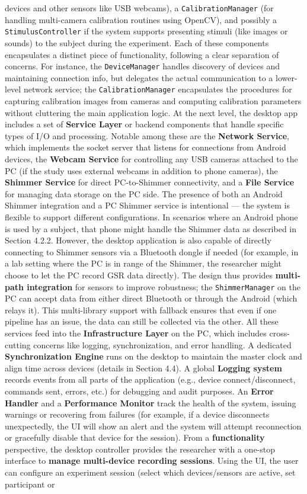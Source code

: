 devices and other sensors like USB webcams), a \texttt{CalibrationManager} (for handling multi-camera calibration routines using OpenCV), and possibly a \texttt{StimulusController} if the system supports presenting stimuli (like images or sounds) to the subject during the experiment. Each of these components encapsulates a distinct piece of functionality, following a clear separation of concerns. For instance, the \texttt{DeviceManager} handles discovery of devices and maintaining connection info, but delegates the actual communication to a lower-level network service; the \texttt{CalibrationManager} encapsulates the procedures for capturing calibration images from cameras and computing calibration parameters without cluttering the main application logic. At the next level, the desktop app includes a set of \textbf{Service Layer} or backend components that handle specific types of I/O and processing. Notable among these are the \textbf{Network Service}, which implements the socket server that listens for connections from Android devices, the \textbf{Webcam Service} for controlling any USB cameras attached to the PC (if the study uses external webcams in addition to phone cameras), the \textbf{Shimmer Service} for direct PC-to-Shimmer connectivity, and a \textbf{File Service} for managing data storage on the PC side. The presence of both an Android Shimmer integration and a PC Shimmer service is intentional --- the system is flexible to support different configurations. In scenarios where an Android phone is used by a subject, that phone might handle the Shimmer data as described in Section 4.2.2. However, the desktop application is also capable of directly connecting to Shimmer sensors via a Bluetooth dongle if needed (for example, in a lab setting where the PC is in range of the Shimmer, the researcher might choose to let the PC record GSR data directly). The design thus provides \textbf{multi-path integration} for sensors to improve robustness; the \texttt{ShimmerManager} on the PC can accept data from either direct Bluetooth or through the Android (which relays it). This multi-library support with fallback ensures that even if one pipeline has an issue, the data can still be collected via the other. All these services feed into the \textbf{Infrastructure Layer} on the PC, which includes cross-cutting concerns like logging, synchronization, and error handling. A dedicated \textbf{Synchronization Engine} runs on the desktop to maintain the master clock and align time across devices (details in Section 4.4). A global \textbf{Logging system} records events from all parts of the application (e.g., device connect/disconnect, commands sent, errors, etc.) for debugging and audit purposes. An \textbf{Error Handler} and a \textbf{Performance Monitor} track the health of the system, issuing warnings or recovering from failures (for example, if a device disconnects unexpectedly, the UI will show an alert and the system will attempt reconnection or gracefully disable that device for the session). From a \textbf{functionality} perspective, the desktop controller provides the researcher with a one-stop interface to \textbf{manage multi-device recording sessions}. Using the UI, the user can configure an experiment session (select which devices/sensors are active, set participant or 
